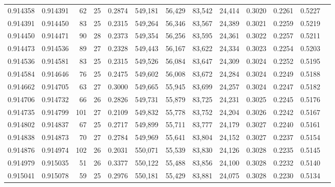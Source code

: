 \begin{tabular}{rrrrrrrrrrrrr}
0.914358 & 0.914391 &    62 &  25 &                                     0.2874 & 549,181 &  56,429 &  83,542 &  24,414 & 0.3020 & 0.2261 & 0.5227 \\
0.914391 & 0.914450 &    83 &  25 &                                     0.2315 & 549,264 &  56,346 &  83,567 &  24,389 & 0.3021 & 0.2259 & 0.5219 \\
0.914450 & 0.914471 &    90 &  28 &                                     0.2373 & 549,354 &  56,256 &  83,595 &  24,361 & 0.3022 & 0.2257 & 0.5211 \\
0.914473 & 0.914536 &    89 &  27 &                                     0.2328 & 549,443 &  56,167 &  83,622 &  24,334 & 0.3023 & 0.2254 & 0.5203 \\
0.914536 & 0.914581 &    83 &  25 &                                     0.2315 & 549,526 &  56,084 &  83,647 &  24,309 & 0.3024 & 0.2252 & 0.5195 \\
0.914584 & 0.914646 &    76 &  25 &                                     0.2475 & 549,602 &  56,008 &  83,672 &  24,284 & 0.3024 & 0.2249 & 0.5188 \\
0.914662 & 0.914705 &    63 &  27 &                                     0.3000 & 549,665 &  55,945 &  83,699 &  24,257 & 0.3024 & 0.2247 & 0.5182 \\
0.914706 & 0.914732 &    66 &  26 &                                     0.2826 & 549,731 &  55,879 &  83,725 &  24,231 & 0.3025 & 0.2245 & 0.5176 \\
0.914735 & 0.914799 &   101 &  27 &                                     0.2109 & 549,832 &  55,778 &  83,752 &  24,204 & 0.3026 & 0.2242 & 0.5167 \\
0.914802 & 0.914837 &    67 &  25 &                                     0.2717 & 549,899 &  55,711 &  83,777 &  24,179 & 0.3027 & 0.2240 & 0.5161 \\
0.914838 & 0.914873 &    70 &  27 &                                     0.2784 & 549,969 &  55,641 &  83,804 &  24,152 & 0.3027 & 0.2237 & 0.5154 \\
0.914876 & 0.914974 &   102 &  26 &                                     0.2031 & 550,071 &  55,539 &  83,830 &  24,126 & 0.3028 & 0.2235 & 0.5145 \\
0.914979 & 0.915035 &    51 &  26 &                                     0.3377 & 550,122 &  55,488 &  83,856 &  24,100 & 0.3028 & 0.2232 & 0.5140 \\
0.915041 & 0.915078 &    59 &  25 &                                     0.2976 & 550,181 &  55,429 &  83,881 &  24,075 & 0.3028 & 0.2230 & 0.5134 \\

\end{tabular}
